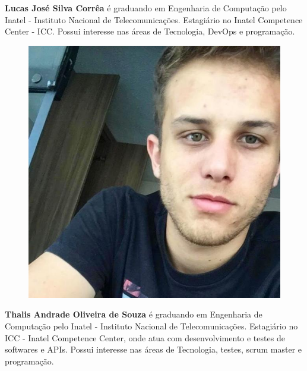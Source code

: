 \textbf{Lucas José Silva Corrêa} é graduando em Engenharia de Computação pelo Inatel - Instituto Nacional de Telecomunicações. Estagiário no Inatel Competence Center - ICC. Possui interesse nas áreas de Tecnologia, DevOps e programação.\newline

\begin{figure}
\includegraphics[width=\linewidth]{figuras/autor_thalis.jpg}
\end{figure}

\textbf{Thalis Andrade Oliveira de Souza} é graduando em Engenharia de Computação pelo Inatel - Instituto Nacional de Telecomunicações. Estagiário no ICC -  Inatel Competence Center, onde atua com desenvolvimento e testes de softwares e APIs. Possui interesse nas áreas de Tecnologia, testes, scrum master e programação.\newline

